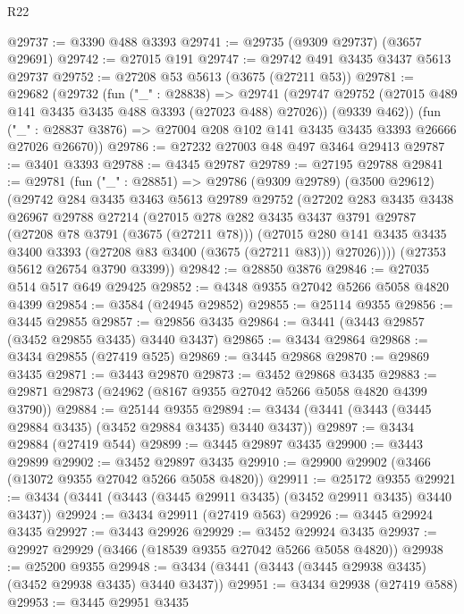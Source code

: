\begin{lexlean}{R22}
\begin{coremodule}
@29737 := @3390 @488 @3393
@29741 := @29735 (@9309 @29737) (@3657 @29691)
@29742 := @27015 @191
@29747 := @29742 @491 @3435 @3437 @5613 @29737
@29752 := @27208 @53 @5613 (@3675 (@27211 @53))
@29781 := @29682
    (@29732
      (fun ("_" : @28838) =>
      @29741
        (@29747 @29752 (@27015 @489 @141 @3435 @3435 @488 @3393 (@27023 @488) @27026))
        (@9339 @462))
      (fun ("_" : @28837 @3876) => @27004 @208 @102 @141 @3435 @3435 @3393 @26666 @27026 @26670))
@29786 := @27232 @27003 @48 @497 @3464 @29413
@29787 := @3401 @3393
@29788 := @4345 @29787
@29789 := @27195 @29788
@29841 := @29781
    (fun ("_" : @28851) =>
    @29786
      (@9309 @29789)
      (@3500 @29612)
      (@29742
        @284
        @3435
        @3463
        @5613
        @29789
        @29752
        (@27202
          @283
          @3435
          @3438
          @26967
          @29788
          @27214
          (@27015
            @278
            @282
            @3435
            @3437
            @3791
            @29787
            (@27208 @78 @3791 (@3675 (@27211 @78)))
            (@27015
              @280
              @141
              @3435
              @3435
              @3400
              @3393
              (@27208 @83 @3400 (@3675 (@27211 @83)))
              @27026))))
      (@27353 @5612 @26754 @3790 @3399))
@29842 := @28850 @3876
@29846 := @27035 @514 @517 @649 @29425
@29852 := @4348 @9355 @27042 @5266 @5058 @4820 @4399
@29854 := @3584 (@24945 @29852)
@29855 := @25114 @9355
@29856 := @3445 @29855
@29857 := @29856 @3435
@29864 := @3441 (@3443 @29857 (@3452 @29855 @3435) @3440 @3437)
@29865 := @3434 @29864
@29868 := @3434 @29855 (@27419 @525)
@29869 := @3445 @29868
@29870 := @29869 @3435
@29871 := @3443 @29870
@29873 := @3452 @29868 @3435
@29883 := @29871 @29873 (@24962 (@8167 @9355 @27042 @5266 @5058 @4820 @4399 @3790))
@29884 := @25144 @9355
@29894 := @3434 (@3441 (@3443 (@3445 @29884 @3435) (@3452 @29884 @3435) @3440 @3437))
@29897 := @3434 @29884 (@27419 @544)
@29899 := @3445 @29897 @3435
@29900 := @3443 @29899
@29902 := @3452 @29897 @3435
@29910 := @29900 @29902 (@3466 (@13072 @9355 @27042 @5266 @5058 @4820))
@29911 := @25172 @9355
@29921 := @3434 (@3441 (@3443 (@3445 @29911 @3435) (@3452 @29911 @3435) @3440 @3437))
@29924 := @3434 @29911 (@27419 @563)
@29926 := @3445 @29924 @3435
@29927 := @3443 @29926
@29929 := @3452 @29924 @3435
@29937 := @29927 @29929 (@3466 (@18539 @9355 @27042 @5266 @5058 @4820))
@29938 := @25200 @9355
@29948 := @3434 (@3441 (@3443 (@3445 @29938 @3435) (@3452 @29938 @3435) @3440 @3437))
@29951 := @3434 @29938 (@27419 @588)
@29953 := @3445 @29951 @3435

\end{coremodule}
\end{lexlean}
